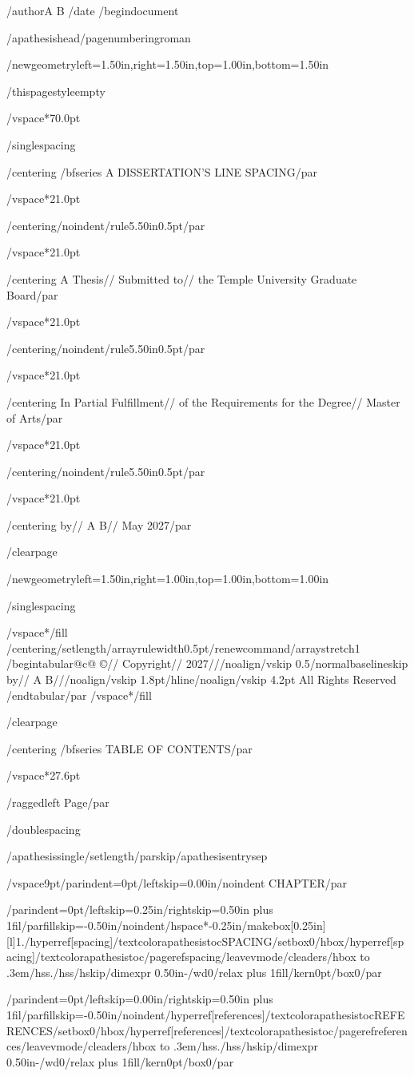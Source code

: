 /author{A B}
/date{}
/begin{document}


/apathesishead/pagenumbering{roman}

/newgeometry{left=1.50in,right=1.50in,top=1.00in,bottom=1.50in}

/thispagestyle{empty}

/vspace*{70.0pt}

/singlespacing

{/centering
/bfseries A DISSERTATION'S LINE SPACING/par}

/vspace*{21.0pt}

{/centering/noindent/rule{5.50in}{0.5pt}/par}

/vspace*{21.0pt}

{/centering
A Thesis//
Submitted to//
the Temple University Graduate Board/par}

/vspace*{21.0pt}

{/centering/noindent/rule{5.50in}{0.5pt}/par}

/vspace*{21.0pt}

{/centering
In Partial Fulfillment//
of the Requirements for the Degree//
Master of Arts/par}

/vspace*{21.0pt}

{/centering/noindent/rule{5.50in}{0.5pt}/par}

/vspace*{21.0pt}

{/centering
by//
A B//
May 2027/par}

/clearpage

/newgeometry{left=1.50in,right=1.00in,top=1.00in,bottom=1.00in}

/singlespacing

/vspace*{/fill}
{/centering/setlength{/arrayrulewidth}{0.5pt}/renewcommand{/arraystretch}{1}
/begin{tabular}{@{}c@{}}
©//
Copyright//
2027///noalign{/vskip 0.5/normalbaselineskip}
by//
A B///noalign{/vskip 1.8pt}/hline/noalign{/vskip 4.2pt}
All Rights Reserved
/end{tabular}/par}
/vspace*{/fill}

/clearpage

{/centering
/bfseries TABLE OF CONTENTS/par}

/vspace*{27.6pt}

{/raggedleft
Page/par}

/doublespacing

{/apathesissingle/setlength{/parskip}{/apathesisentrysep}

/vspace{9pt}{/parindent=0pt/leftskip=0.00in/noindent CHAPTER/par}

{/parindent=0pt/leftskip=0.25in/rightskip=0.50in plus 1fil/parfillskip=-0.50in/noindent/hspace*{-0.25in}/makebox[0.25in][l]{1.}/hyperref[spacing]{/textcolor{apathesistoc}{SPACING}}/setbox0/hbox{/hyperref[spacing]{/textcolor{apathesistoc}{/pageref{spacing}}}}/leavevmode/cleaders/hbox to .3em{/hss./hss}/hskip/dimexpr 0.50in-/wd0/relax plus 1fill/kern0pt/box0/par}

{/parindent=0pt/leftskip=0.00in/rightskip=0.50in plus 1fil/parfillskip=-0.50in/noindent/hyperref[references]{/textcolor{apathesistoc}{REFERENCES}}/setbox0/hbox{/hyperref[references]{/textcolor{apathesistoc}{/pageref{references}}}}/leavevmode/cleaders/hbox to .3em{/hss./hss}/hskip/dimexpr 0.50in-/wd0/relax plus 1fill/kern0pt/box0/par}

}

